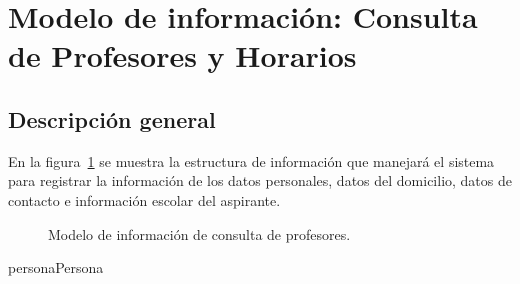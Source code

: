 \newpage

\section{Modelo de información: Consulta de Profesores y Horarios}

\subsection{Descripción general}

En la figura~\ref{fig:modeloinfoprofe} se muestra la estructura de información que manejará el sistema para registrar la información de los datos personales, datos del domicilio, datos de contacto e información escolar del aspirante.

\begin{figure}[htbp!]
	\begin{center}
		\caption{Modelo de información de consulta de profesores.}
		\label{fig:modeloinfoprofe}
	\end{center}
\end{figure}


\begin{BusinessEntity}{persona}{Persona}
	
	
	
	
\end{BusinessEntity}

